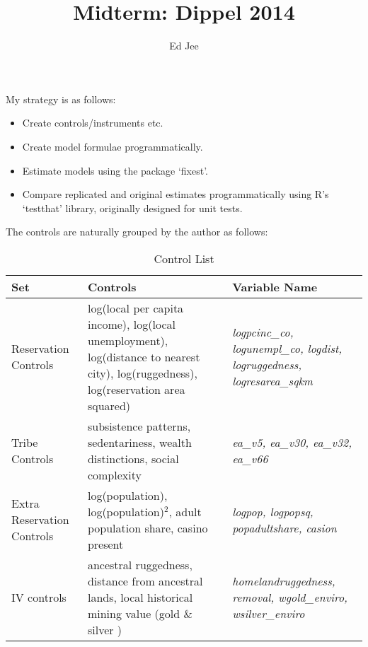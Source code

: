 \documentclass{article}
\author{Ed Jee}
\title{Midterm: Dippel 2014}
\begin{document}
\maketitle

My strategy is as follows:

\begin{itemize}
    \item Create controls/instruments etc.
    \item Create model formulae programmatically.
    \item Estimate models using the package `fixest'.
    \item Compare replicated and original estimates programmatically using
    R's `testthat' library, originally designed for unit tests.  
\end{itemize}

The controls are naturally grouped by the author as follows:

\begin{table}[htbp]
    \centering\begin{tabular}{| m{4cm} | m{5cm} | m{5cm} | }
        \hline 
    Set & Controls  & Variable Name\\ \hline\hline
    Reservation Controls & log(local per capita  income),
    log(local unemployment),
    log(distance to nearest city),
    log(ruggedness),
    log(reservation area squared) &
    \textit{
        logpcinc\_co,
        logunempl\_co,
        logdist,
        logruggedness,
        logresarea\_sqkm
    }  \\  \hline
    Tribe Controls & subsistence patterns,
    sedentariness,
    wealth distinctions,
    social complexity &
    \textit{
        ea\_v5,
        ea\_v30,
        ea\_v32,
        ea\_v66
    }\\ \hline
    Extra Reservation Controls & log(population),
    log(population)$^2$,
    adult population share,
    casino present &
    \textit{
        logpop,
        logpopsq,
        popadultshare,
        casion
    }\\ \hline
    IV controls & ancestral ruggedness,
    distance from ancestral lands,
    local historical mining value (gold \& silver  ) 
    & \textit{
        homelandruggedness,
        removal,
        wgold\_enviro,
        wsilver\_enviro
    }\\ 
    \hline
    
    \end{tabular}
    \caption{Control List}
    \label{controls}
\end{table}
\end{document}

